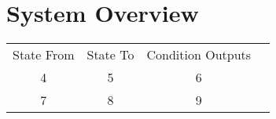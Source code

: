 \section{System Overview}

\begin{tabular}{ c c c c }
  State From & State To & Condition Outputs \\
  4 & 5 & 6 \\
  7 & 8 & 9 \\
\end{tabular}
